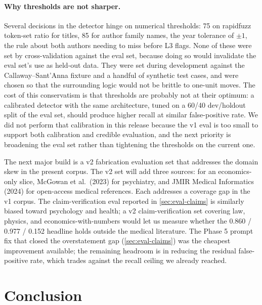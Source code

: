 \documentclass[12pt]{article}
\begin{document}
\paragraph{Why thresholds are not sharper.} Several decisions in the detector hinge on numerical thresholds: 75 on rapidfuzz token-set ratio for titles, 85 for author family names, the year tolerance of $\pm 1$, the rule about both authors needing to miss before L3 flags. None of these were set by cross-validation against the eval set, because doing so would invalidate the eval set's use as held-out data. They were set during development against the Callaway--Sant'Anna fixture and a handful of synthetic test cases, and were chosen so that the surrounding logic would not be brittle to one-unit moves. The cost of this conservatism is that thresholds are probably not at their optimum: a calibrated detector with the same architecture, tuned on a 60/40 dev/holdout split of the eval set, should produce higher recall at similar false-positive rate. We did not perform that calibration in this release because the v1 eval is too small to support both calibration and credible evaluation, and the next priority is broadening the eval set rather than tightening the thresholds on the current one.

The next major build is a v2 fabrication evaluation set that addresses the domain skew in the present corpus. The v2 set will add three sources: \citet{buchanan_hill_shapoval_2024} for an economics-only slice, McGowan et al.\ (2023) for psychiatry, and JMIR Medical Informatics (2024) for open-access medical references. Each addresses a coverage gap in the v1 corpus. The claim-verification eval reported in \cref{sec:eval-claims} is similarly biased toward psychology and health; a v2 claim-verification set covering law, physics, and economics-with-numbers would let us measure whether the 0.860 / 0.977 / 0.152 headline holds outside the medical literature. The Phase 5 prompt fix that closed the overstatement gap (\cref{sec:eval-claims}) was the cheapest improvement available; the remaining headroom is in reducing the residual false-positive rate, which trades against the recall ceiling we already reached.

\section{Conclusion}\label{sec:conclusion}
\end{document}
